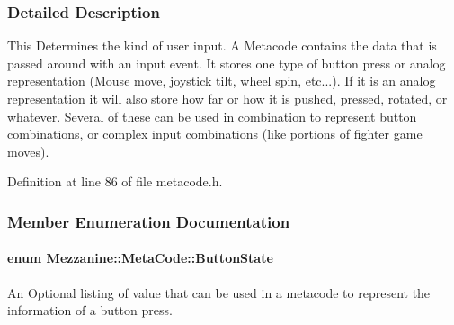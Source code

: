 \subsubsection{Detailed Description}
This Determines the kind of user input. A Metacode contains the data that is passed around with an input event. It stores one type of button press or analog representation (Mouse move, joystick tilt, wheel spin, etc...). If it is an analog representation it will also store how far or how it is pushed, pressed, rotated, or whatever. Several of these can be used in combination to represent button combinations, or complex input combinations (like portions of fighter game moves). 

Definition at line 86 of file metacode.h.



\subsubsection{Member Enumeration Documentation}
\hypertarget{classMezzanine_1_1MetaCode_a65b6d86ef846369bd8f3fd944a455fd0}{
\paragraph[{ButtonState}]{\setlength{\rightskip}{0pt plus 5cm}enum {\bf Mezzanine::MetaCode::ButtonState}}\hfill}
\label{classMezzanine_1_1MetaCode_a65b6d86ef846369bd8f3fd944a455fd0}


An Optional listing of value that can be used in a metacode to represent the information of a button press. 


